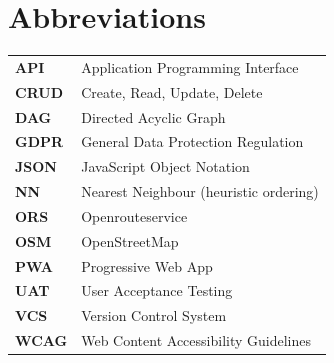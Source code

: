 
\section*{Abbreviations}
\begin{tabular}{p{} p{}}
\textbf{API} & Application Programming Interface\\
\textbf{CRUD} & Create, Read, Update, Delete\\
\textbf{DAG} & Directed Acyclic Graph\\
\textbf{GDPR} & General Data Protection Regulation\\
\textbf{JSON} & JavaScript Object Notation\\
\textbf{NN} & Nearest Neighbour (heuristic ordering)\\
\textbf{ORS} & Openrouteservice\\
\textbf{OSM} & OpenStreetMap\\
\textbf{PWA} & Progressive Web App\\
\textbf{UAT} & User Acceptance Testing\\
\textbf{VCS} & Version Control System\\
\textbf{WCAG} & Web Content Accessibility Guidelines\\
\end{tabular}

